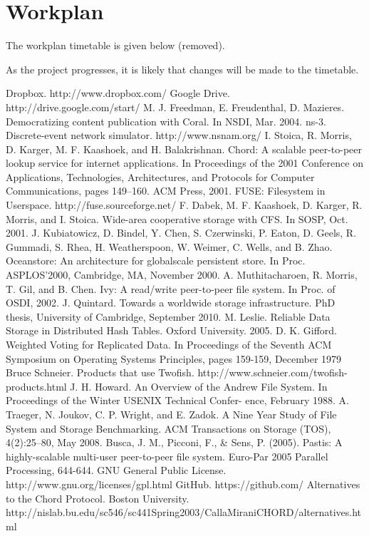 \documentclass[a4paper, 11pt]{article}
\begin{document}
\section{Workplan}

The workplan timetable is given below (removed).

As the project progresses, it is likely that changes will be made to the timetable.


\begin{thebibliography}{10}
Dropbox. http://www.dropbox.com/
Google Drive. http://drive.google.com/start/
M. J. Freedman, E. Freudenthal, D. Mazieres.
Democratizing content publication with Coral.
In NSDI, Mar. 2004.
ns-3. Discrete-event network simulator. http://www.nsnam.org/
I. Stoica, R. Morris, D. Karger, M. F. Kaashoek, and
H. Balakrishnan. Chord: A scalable peer-to-peer lookup
service for internet applications. In Proceedings of the 2001
Conference on Applications, Technologies, Architectures,
and Protocols for Computer Communications, pages
149–160. ACM Press, 2001.
FUSE: Filesystem in Userspace. http://fuse.sourceforge.net/ 
F. Dabek, M. F. Kaashoek, D. Karger, R. Morris, and I. Stoica. Wide-area
cooperative storage with CFS. In SOSP, Oct. 2001.
J. Kubiatowicz, D. Bindel, Y. Chen, S. Czerwinski, P. Eaton, D. Geels, R. Gummadi, S. Rhea,
H. Weatherspoon, W. Weimer, C. Wells, and B. Zhao. Oceanstore: An architecture for globalscale persistent store. In Proc. ASPLOS’2000, Cambridge, MA, November 2000.
A. Muthitacharoen, R. Morris, T. Gil, and B. Chen. 
Ivy: A read/write peer-to-peer file system. 
In Proc. of OSDI, 2002.
J. Quintard. Towards a worldwide storage infrastructure.
PhD thesis, University of Cambridge, September 2010.
M. Leslie.
Reliable Data Storage in Distributed Hash Tables. Oxford University. 2005.
D. K. Gifford. Weighted Voting for Replicated 
Data. In Proceedings of the Seventh ACM 
Symposium on Operating Systems Principles, 
pages 159-159, December 1979
Bruce Schneier. Products that use Twofish. http://www.schneier.com/twofish-products.html
J. H. Howard. An Overview of the Andrew File System.
In Proceedings of the Winter USENIX Technical Confer-
ence, February 1988.
A. Traeger, N. Joukov, C. P. Wright, and E. Zadok. A
Nine Year Study of File System and Storage Benchmarking. ACM Transactions on Storage (TOS), 4(2):25–80,
May 2008.
Busca, J. M., Picconi, F., \& Sens, P. (2005). Pastis: A highly-scalable multi-user peer-to-peer file system. Euro-Par 2005 Parallel Processing, 644-644.
GNU General Public License. http://www.gnu.org/licenses/gpl.html
GitHub. https://github.com/ 
Alternatives to the Chord Protocol. Boston University. http://nislab.bu.edu/sc546/sc441Spring2003/CallaMiraniCHORD/alternatives.html
\end{thebibliography}
\end{document}
